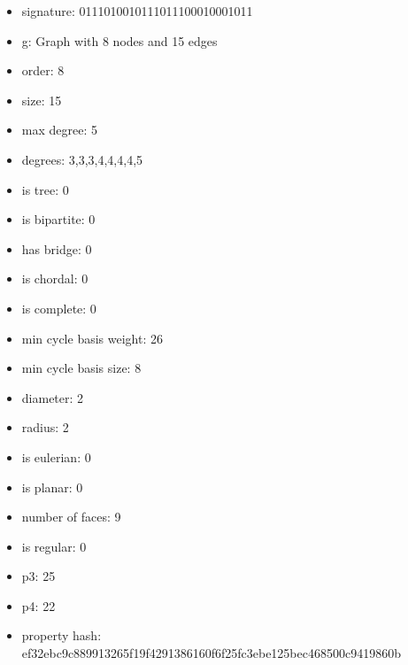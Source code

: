 \begin{itemize}
\item signature: 0111010010111011100010001011
\item g: Graph with 8 nodes and 15 edges
\item order: 8
\item size: 15
\item max degree: 5
\item degrees: 3,3,3,4,4,4,4,5
\item is tree: 0
\item is bipartite: 0
\item has bridge: 0
\item is chordal: 0
\item is complete: 0
\item min cycle basis weight: 26
\item min cycle basis size: 8
\item diameter: 2
\item radius: 2
\item is eulerian: 0
\item is planar: 0
\item number of faces: 9
\item is regular: 0
\item p3: 25
\item p4: 22
\item property hash: ef32ebc9c889913265f19f4291386160f6f25fc3ebe125bec468500c9419860b
\end{itemize}
\newpage
\begin{figure}
\end{figure}
